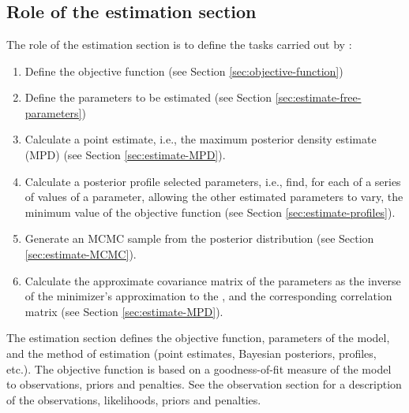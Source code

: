 \section{\label{sec:estimation-section}}

\subsection{Role of the estimation section\label{sec:role-of-the-estimation-section}}

The role of the estimation section is to define the tasks carried out by \SPM: 

\begin{enumerate}
  \item Define the objective function (see Section \ref{sec:objective-function})
  \item Define the parameters to be estimated (see Section \ref{sec:estimate-free-parameters})
  \item Calculate a point estimate, i.e., the maximum posterior density estimate (MPD) (see Section \ref{sec:estimate-MPD}).
  \item Calculate a posterior profile selected parameters, i.e., find, for each of a series of values of a parameter, allowing the other estimated parameters to vary, the minimum value of the objective function (see Section \ref{sec:estimate-profiles}).
  \item Generate an MCMC sample from the posterior distribution (see Section \ref{sec:estimate-MCMC}).
  \item Calculate the approximate covariance matrix of the parameters as the inverse of the minimizer\textquoteright{}s approximation to the , and the corresponding correlation matrix (see Section \ref{sec:estimate-MPD}).
\end{enumerate}

The estimation section defines the objective function, parameters of the model, and the method of estimation (point estimates, Bayesian posteriors, profiles, etc.). The objective function is based on a goodness-of-fit measure of the model to observations, priors and penalties. See the observation section for a description of the observations, likelihoods, priors and penalties. 

\subsection{\label{sec:objective-function}}

